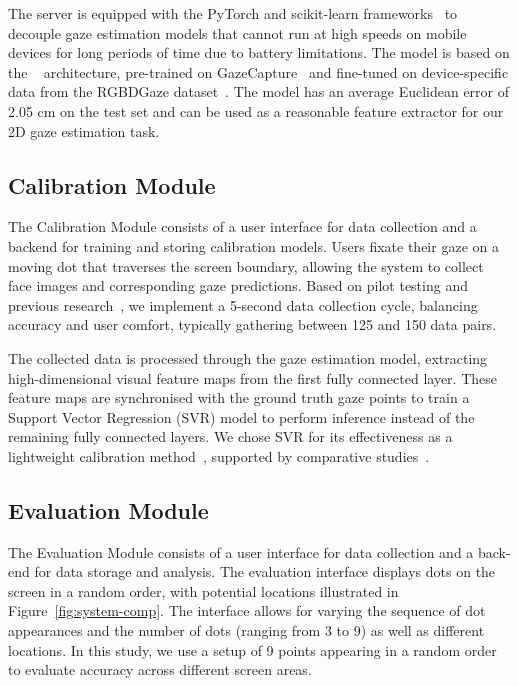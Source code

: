The server is equipped with the PyTorch and scikit-learn frameworks~\cite{pytorch2024, sklearn2024} to decouple gaze estimation models that cannot run at high speeds on mobile devices for long periods of time due to battery limitations. The model is based on the ~\cite{krafka2016eye} architecture, pre-trained on GazeCapture~\cite{krafka2016eye} and fine-tuned on device-specific data from the RGBDGaze dataset~\cite{arakawa2022rgbdgaze}. The model has an average Euclidean error of 2.05 cm on the test set and can be used as a reasonable feature extractor for our 2D gaze estimation task.

\subsection{Calibration Module}\label{subsec:calibration_module}
The Calibration Module consists of a user interface for data collection and a backend for training and storing calibration models. Users fixate their gaze on a moving dot that traverses the screen boundary, allowing the system to collect face images and corresponding gaze predictions. Based on pilot testing and previous research~\cite{kong2021eyemu, lei2023DynamicRead}, we implement a 5-second data collection cycle, balancing accuracy and user comfort, typically gathering between 125 and 150 data pairs.

The collected data is processed through the gaze estimation model, extracting high-dimensional visual feature maps from the first fully connected layer. These feature maps are synchronised with the ground truth gaze points to train a Support Vector Regression (SVR) model to perform inference instead of the remaining fully connected layers. We chose SVR for its effectiveness as a lightweight calibration method~\cite{lei2023DynamicRead, krafka2016eye, valliappan2020accelerating}, supported by comparative studies~\cite{alexiev2019enhancing}.


\subsection{Evaluation Module}\label{subsec:evaluation_module}

The Evaluation Module consists of a user interface for data collection and a back-end for data storage and analysis. The evaluation interface displays dots on the screen in a random order, with potential locations illustrated in Figure~\ref{fig:system-comp}. The interface allows for varying the sequence of dot appearances and the number of dots (ranging from 3 to 9) as well as different locations. In this study, we use a setup of 9 points appearing in a random order to evaluate accuracy across different screen areas.

